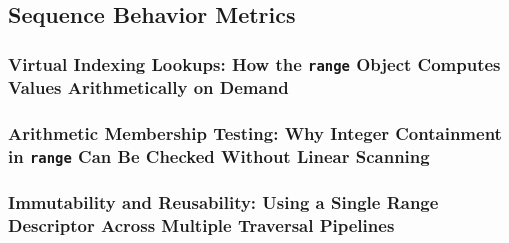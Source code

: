 \subsection{Sequence Behavior Metrics}
\subsubsection{Virtual Indexing Lookups: How the \texttt{range} Object Computes Values Arithmetically on Demand}
\subsubsection{Arithmetic Membership Testing: Why Integer Containment in \texttt{range} Can Be Checked Without Linear Scanning}
\subsubsection{Immutability and Reusability: Using a Single Range Descriptor Across Multiple Traversal Pipelines}
